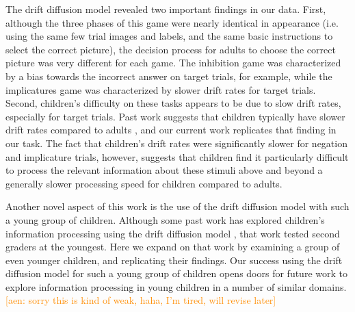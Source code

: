 \documentclass[10pt,letterpaper]{article}
\newcommand{\aen}[1]{\textcolor{DarkOrange}{[aen: #1]}}
\begin{document}
The drift diffusion model revealed two important findings in our data.  First, although the three phases of this game were nearly identical in appearance (i.e. using the same few trial images and labels, and the same basic instructions to select the correct picture), the decision process for adults to choose the correct picture was very different for each game.  The inhibition game was characterized by a bias towards the incorrect answer on target trials, for example, while the implicatures game was characterized by slower drift rates for target trials.  Second, children's difficulty on these tasks appears to be due to slow drift rates, especially for target trials.  Past work suggests that children typically have slower drift rates compared to adults \cite{ratcliff2012}, and our current work replicates that finding in our task.  The fact that children's drift rates were significantly slower for negation and implicature trials, however, suggests that children find it particularly difficult to process the relevant information about these stimuli above and beyond a generally slower processing speed for children compared to adults.

Another novel aspect of this work is the use of the drift diffusion model with such a young group of children.  Although some past work has explored children's information processing using the drift diffusion model \cite{ratcliff2012}, that work tested second graders at the youngest.  Here we expand on that work by examining a group of even younger children, and replicating their findings.  Our success using the drift diffusion model for such a young group of children opens doors for future work to explore information processing in young children in a number of similar domains.  \aen{sorry this is kind of weak, haha, I'm tired, will revise later}

%



\setlength{\bibleftmargin}{.125in}
\setlength{\bibindent}{-\bibleftmargin}


\end{document}

